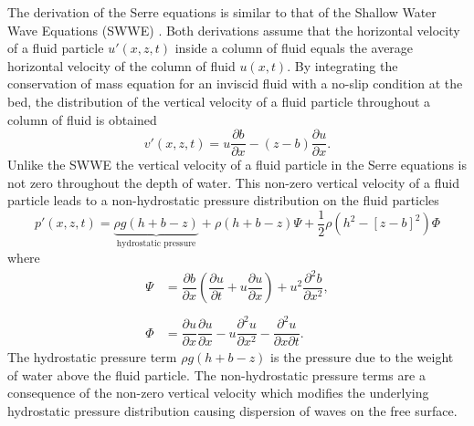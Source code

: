 The derivation of the Serre equations is similar to that of the Shallow Water Wave Equations (SWWE) \cite{Liggett-1994}. Both derivations assume that the horizontal velocity of a fluid particle $u'(x,z,t)$ inside a column of fluid equals the average horizontal velocity of the column of fluid $u(x,t)$. By integrating the conservation of mass equation for an inviscid fluid with a no-slip condition at the bed, the distribution of the vertical velocity of a fluid particle throughout a column of fluid is obtained \cite{Zoppou-2014} 
\begin{equation}
v'(x,z,t) = u \frac{\partial b}{\partial x} - (z - b) \frac{\partial u}{\partial x}.
\label{eqn:VertVelSerre}
\end{equation}
Unlike the SWWE the vertical velocity of a fluid particle in the Serre equations is not zero throughout the depth of water. This non-zero vertical velocity of a fluid particle leads to a non-hydrostatic pressure distribution on the fluid particles \cite{Zoppou-2014}
\begin{equation}
\label{eqn:SerrePress}
 p'(x,z,t) = \underbrace{ \rho g \left(h + b - z\right)}_{\text{hydrostatic pressure}} + \rho \left(h + b - z\right) \Psi + \frac{1}{2} \rho \left(h^2 - \left[z - b \right]^2\right) {\Phi }
\end{equation} 
where
\begin{subequations}
	\begin{align}
	{ \Psi }  &= \dfrac{\partial b}{\partial x}\left(\dfrac{\partial u}{\partial t} + u\dfrac{\partial u}{\partial x} \right)  + u^2\dfrac{\partial^2 b}{\partial x^2}, \label{eqn:SerreeqnPsi} 
	\\ \nonumber \\
	{ \Phi }  &= \dfrac{\partial u }{\partial x} \dfrac{\partial u}{\partial x} -u \dfrac{\partial^2 u}{\partial x^2}  - \dfrac{\partial^2 u}{\partial x \partial t} . \label{eqn:SerreeqnPhi} 
	\end{align}
	\label{eqn:FullSerreNonConVarDef}
\end{subequations}
The hydrostatic pressure term $\rho g \left(h + b - z\right)$ is the pressure due to the weight of water above the fluid particle. The non-hydrostatic pressure terms are a consequence of the non-zero vertical velocity which modifies the underlying hydrostatic pressure distribution causing dispersion of waves on the free surface. 

